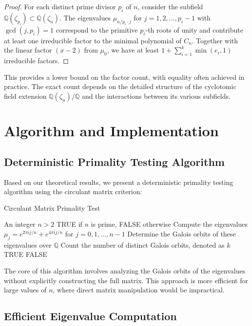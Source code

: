 \begin{proof}
For each distinct prime divisor $p_i$ of $n$, consider the subfield $\mathbb{Q}(\zeta_{p_i}) \subset \mathbb{Q}(\zeta_n)$. The eigenvalues $\mu_{n/p_i \cdot j}$ for $j = 1, 2, \ldots, p_i-1$ with $\gcd(j, p_i) = 1$ correspond to the primitive $p_i$-th roots of unity and contribute at least one irreducible factor to the minimal polynomial of $C_n$. Together with the linear factor $(x-2)$ from $\mu_0$, we have at least $1 + \sum_{i=1}^k \min(e_i, 1)$ irreducible factors.
\end{proof}

This provides a lower bound on the factor count, with equality often achieved in practice. The exact count depends on the detailed structure of the cyclotomic field extension $\mathbb{Q}(\zeta_n)/\mathbb{Q}$ and the interactions between its various subfields.

\section{Algorithm and Implementation}

\subsection{Deterministic Primality Testing Algorithm}

Based on our theoretical results, we present a deterministic primality testing algorithm using the circulant matrix criterion:

\begin{algorithm}
\caption{Circulant Matrix Primality Test}
\begin{algorithmic}[1]
\REQUIRE An integer $n > 2$
\ENSURE TRUE if $n$ is prime, FALSE otherwise
\STATE Compute the eigenvalues $\mu_j = e^{2\pi i j/n} + e^{4\pi i j/n}$ for $j = 0, 1, \ldots, n-1$
\STATE Determine the Galois orbits of these eigenvalues over $\mathbb{Q}$
\STATE Count the number of distinct Galois orbits, denoted as $k$
    \RETURN TRUE
\ELSE
    \RETURN FALSE
\ENDIF
\end{algorithmic}
\end{algorithm}

The core of this algorithm involves analyzing the Galois orbits of the eigenvalues without explicitly constructing the full matrix. This approach is more efficient for large values of $n$, where direct matrix manipulation would be impractical.

\subsection{Efficient Eigenvalue Computation}

